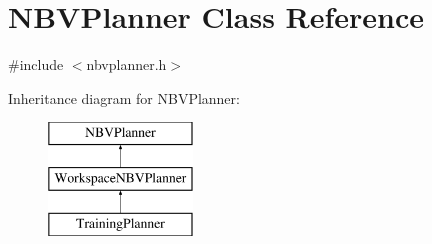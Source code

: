 \hypertarget{classNBVPlanner}{}\section{N\+B\+V\+Planner Class Reference}
\label{classNBVPlanner}


{\ttfamily \#include $<$nbvplanner.\+h$>$}

Inheritance diagram for N\+B\+V\+Planner\+:\begin{figure}[H]
\begin{center}
\leavevmode
\includegraphics[height=3.000000cm]{classNBVPlanner}
\end{center}
\end{figure}
